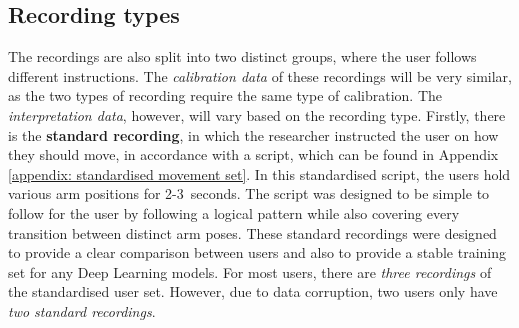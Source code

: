 \subsection*{Recording types}


The recordings are also split into two distinct groups, where the user follows different instructions.
The \textit{calibration data} of these recordings will be very similar, as the two types of recording require the same type of calibration.
The \textit{interpretation data}, however,  will vary based on the recording type.
Firstly, there is the \textbf{standard recording}, in which the researcher instructed the user on how they should move, in accordance with a script, which can be found in Appendix \ref{appendix: standardised movement set}.
In this standardised script, the users hold various arm positions for 2-3~seconds.
The script was designed to be simple to follow for the user by following a logical pattern while also covering every transition between distinct arm poses.
These standard recordings were designed to provide a clear comparison between users and also to provide a stable training set for any Deep Learning models.
For most users, there are \textit{three recordings} of the standardised user set.
However, due to data corruption, two users only have \textit{two standard recordings}.

